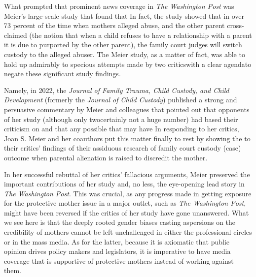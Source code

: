 What prompted that prominent news coverage in \textit{The Washington Post}
was Meier's large-scale study that found that  In fact, the study showed that in over 73 percent of the time when
mothers alleged abuse, and the other parent cross-claimed  (the notion that when a child refuses to have a relationship
with a parent it is due to purported  by the other parent), the family court judges will switch custody to the alleged abuser.
The Meier study, as a matter of fact, was able to hold up admirably to
specious attempts made by two critics\mdash{}with a clear agenda\mdash{}to
negate these significant study findings. \pfl{}

Namely, in 2022, the \textit{Journal of Family Trauma, Child Custody, and
Child Development} (formerly the \textit{Journal of Child Custody}) published a
strong and persuasive commentary by Meier and colleagues that pointed
out that opponents of her study (although only two\mdash{}certainly not
a huge number) had based their criticism on  and that any possible
 that may have  In responding to her critics, 
Joan S. Meier and her coauthors put 
this matter finally to rest by showing the 
to their critics' findings  of their assiduous research of family court custody (case) outcome when parental
alienation is raised to discredit the mother. \pfl{}

In her successful rebuttal of her critics' fallacious arguments, Meier
preserved the important contributions of her study and, no less, the
eye-opening lead story in \textit{The Washington Post}. This was crucial, as any
progress made in getting exposure for the protective mother issue in a
major outlet, such as \textit{The Washington Post}, might have been reversed if
the critics of her study have gone unanswered. What we see here is that
the deeply rooted gender biases casting aspersions on the credibility of
mothers cannot be left unchallenged in either the professional circles
or in the mass media. As for the latter, because it is axiomatic that public
opinion drives policy makers and legislators, it is imperative to have 
media coverage that is supportive of protective mothers instead of working
against them. \pfl{}


